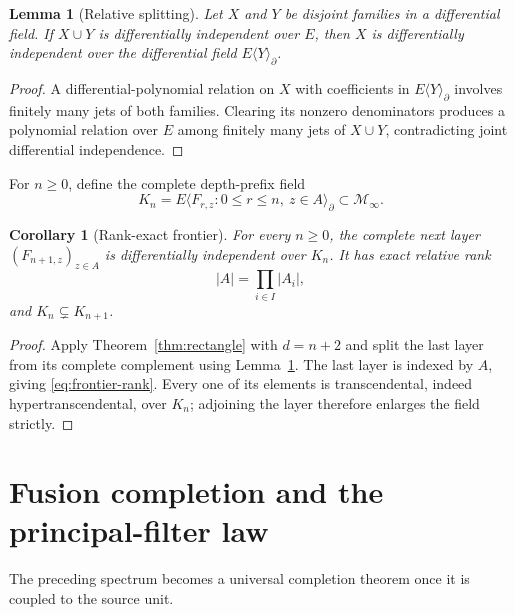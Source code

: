 \documentclass[11pt]{article}
\newtheorem{lemma}[theorem]{Lemma}
\newtheorem{corollary}[theorem]{Corollary}
\theoremstyle{definition}
\theoremstyle{remark}
\newcommand{\cM}{\mathcal M}
\newcommand{\diff}{\partial}
\begin{document}
\begin{lemma}[Relative splitting]\label{lem:relative-splitting}
Let \(X\) and \(Y\) be disjoint families in a differential field.  If \(X\cup Y\) is
differentially independent over \(E\), then \(X\) is differentially independent over the
differential field \(E\langle Y\rangle_{\diff}\).
\end{lemma}

\begin{proof}
A differential-polynomial relation on \(X\) with coefficients in
\(E\langle Y\rangle_{\diff}\) involves finitely many jets of both families.  Clearing its
nonzero denominators produces a polynomial relation over \(E\) among finitely many jets of
\(X\cup Y\), contradicting joint differential independence.
\end{proof}

For \(n\geq0\), define the complete depth-prefix field
\begin{equation}\label{eq:prefix-field}
 K_n=E\langle F_{r,z}:0\leq r\leq n,\ z\in A\rangle_{\diff}
 \subset\cM_\infty.
\end{equation}

\begin{corollary}[Rank-exact frontier]\label{cor:frontier}
For every \(n\geq0\), the complete next layer \((F_{n+1,z})_{z\in A}\) is differentially
independent over \(K_n\).  It has exact relative rank
\begin{equation}\label{eq:frontier-rank}
 |A|=\prod_{i\in I}|A_i|,
\end{equation}
and \(K_n\subsetneq K_{n+1}\).
\end{corollary}

\begin{proof}
Apply Theorem~\ref{thm:rectangle} with \(d=n+2\) and split the last layer from its complete
complement using Lemma~\ref{lem:relative-splitting}.  The last layer is indexed by \(A\), giving
\eqref{eq:frontier-rank}.  Every one of its elements is transcendental, indeed
hypertranscendental, over \(K_n\); adjoining the layer therefore enlarges the field strictly.
\end{proof}

\section{Fusion completion and the principal-filter law}\label{sec:completion}

The preceding spectrum becomes a universal completion theorem once it is coupled to the source
unit.
\end{document}

